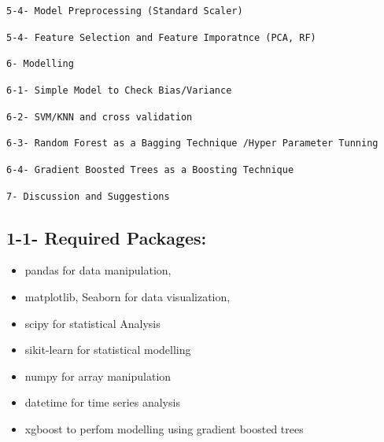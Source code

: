 \documentclass[11pt]{article}
\begin{document}
\texttt{5-4-\ Model\ Preprocessing\ (Standard\ Scaler)}

\texttt{5-4-\ Feature\ Selection\ and\ Feature\ Imporatnce\ (PCA,\ RF)}

\texttt{6-\ Modelling}

\texttt{6-1-\ Simple\ Model\ to\ Check\ Bias/Variance}

\texttt{6-2-\ SVM/KNN\ and\ cross\ validation}

\texttt{6-3-\ Random\ Forest\ as\ a\ Bagging\ Technique\ /Hyper\ Parameter\ Tunning}

\texttt{6-4-\ Gradient\ Boosted\ Trees\ as\ a\ Boosting\ Technique}

\texttt{7-\ Discussion\ and\ Suggestions}

    \subsection{1-1- Required Packages:}\label{required-packages}

\begin{itemize}
\item
  pandas for data manipulation,
\item
  matplotlib, Seaborn for data visualization,
\item
  scipy for statistical Analysis
\item
  sikit-learn for statistical modelling
\item
  numpy for array manipulation
\item
  datetime for time series analysis
\item
  xgboost to perfom modelling using gradient boosted trees
\end{itemize}
\end{document}
